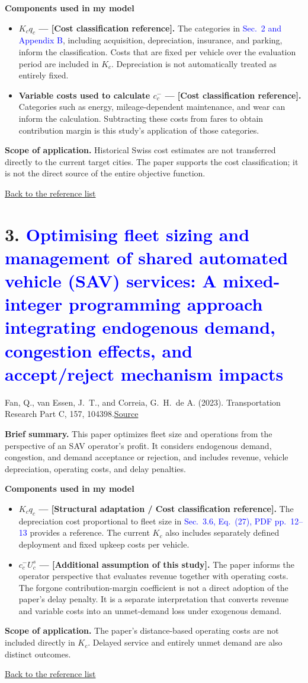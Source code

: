 \documentclass[10pt,a4paper]{article}
\newcommand{\fantitle}{Optimising fleet sizing and management of shared automated vehicle (SAV) services: A mixed-integer programming approach integrating endogenous demand, congestion effects, and accept/reject mechanism impacts}
\newcommand{\backtolist}{\par\smallskip\hyperlink{paper:list}{Back to the reference list}\par}
\begin{document}
\textbf{Components used in my model}
\begin{itemize}
\item \textbf{$K_cq_c$ --- [Cost classification reference].} The categories in \textcolor{blue}{Sec.~2 and Appendix B}, including acquisition, depreciation, insurance, and parking, inform the classification. Costs that are fixed per vehicle over the evaluation period are included in $K_c$. Depreciation is not automatically treated as entirely fixed.
\item \textbf{Variable costs used to calculate $c_c^-$ --- [Cost classification reference].} Categories such as energy, mileage-dependent maintenance, and wear can inform the calculation. Subtracting these costs from fares to obtain contribution margin is this study's application of those categories.
\end{itemize}
\textbf{Scope of application.} Historical Swiss cost estimates are not transferred directly to the current target cities. The paper supports the cost classification; it is not the direct source of the entire objective function.
\backtolist

\newpage
\hypertarget{paper:fan}{}
\section*{3. \textcolor{blue}{\fantitle}}
{\color{blue}Fan, Q., van Essen, J.~T., and Correia, G.~H.~de A. (2023). Transportation Research Part C, 157, 104398.}\quad \href{https://pure.tudelft.nl/ws/portalfiles/portal/166828610/1_s2.0_S0968090X23003881_main.pdf}{Source}

\textbf{Brief summary.} This paper optimizes fleet size and operations from the perspective of an SAV operator's profit. It considers endogenous demand, congestion, and demand acceptance or rejection, and includes revenue, vehicle depreciation, operating costs, and delay penalties.

\textbf{Components used in my model}
\begin{itemize}
\item \textbf{$K_cq_c$ --- [Structural adaptation / Cost classification reference].} The depreciation cost proportional to fleet size in \textcolor{blue}{Sec.~3.6, Eq.~(27), PDF pp.~12--13} provides a reference. The current $K_c$ also includes separately defined deployment and fixed upkeep costs per vehicle.
\item \textbf{$c_c^-U_c^s$ --- [Additional assumption of this study].} The paper informs the operator perspective that evaluates revenue together with operating costs. The forgone contribution-margin coefficient is not a direct adoption of the paper's delay penalty. It is a separate interpretation that converts revenue and variable costs into an unmet-demand loss under exogenous demand.
\end{itemize}
\textbf{Scope of application.} The paper's distance-based operating costs are not included directly in $K_c$. Delayed service and entirely unmet demand are also distinct outcomes.
\backtolist
\end{document}
